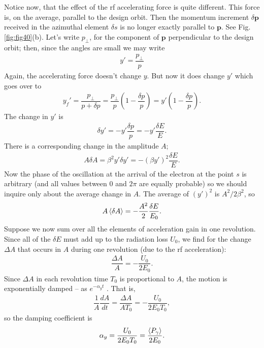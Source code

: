 Notice now, that the effect of the rf accelerating force is quite different. This force is, on the average, parallel to the design orbit. Then the momentum increment $\delta\bm{p}$ received in the azimuthal element $\delta s$ is no longer exactly parallel to $\bm{p}$. See Fig. \ref{fig:fig40}(b). Let's write $p_\perp$, for the component of $\bm{p}$ perpendicular to the design orbit; then, since the angles are small we may write
\begin{align}
	y' = \dfrac{p_\perp}{p}
\end{align}
Again, the accelerating force doesn't change $y$. But now it does change $y'$ which goes over to
\begin{align}
	y_{f}' = \dfrac{p_\perp}{p + \delta p} = \dfrac{p_\perp}{p} \left( 1 - \dfrac{\delta p}{p} \right) = y' \left( 1 - \dfrac{\delta p}{p} \right).
\end{align}
The change in $y'$ is
\begin{align}
	\delta y' = -y' \dfrac{\delta p}{p} = -y' \dfrac{\delta E}{E}.
\end{align}
There is a corresponding change in the amplitude $A$;
\begin{align}
	A \delta A = \beta^2 y' \delta y' = -(\beta y')^2 \dfrac{\delta E}{E}.
\end{align}
Now the phase of the oscillation at the arrival of the electron at the point $s$ is arbitrary
 (and all values between $0$ and $2\pi$ are equally probable) so we should inquire only about the average change in $A$. The average of $(y')^2$ is $A^2/2\beta^2$, so
\begin{align}
	A \left< \delta A \right> = - \dfrac{A^2}{2} \dfrac{\delta E}{E_0}.
\end{align}
Suppose we now sum over all the elements of acceleration gain in one revolution. Since all of the $\delta E$ must add up to the radiation loss $U_0$, we find for the change $\Delta A$ that occurs in $A$ during one revolution (due to the rf acceleration):
\begin{align}
	\dfrac{\Delta A}{A} = - \dfrac{U_0}{2 E_0}.
\end{align}
Since $\Delta A$ in each revolution time $T_0$ is proportional to $A$, the motion is exponentially damped -- as $e^{-\alpha_y t}$ . That is,
\begin{align} \label{eq:4.31}
	\dfrac{1}{A} \dfrac{dA}{dt} = \dfrac{\Delta A}{A T_0} = - \dfrac{U_0}{2 E_0 T_0},
\end{align}
so the damping coefficient is
\begin{align}
	\alpha_y = \dfrac{U_0}{2 E_0 T_0} = \dfrac{\left< P_\gamma \right>}{2 E_0}.
\end{align}
